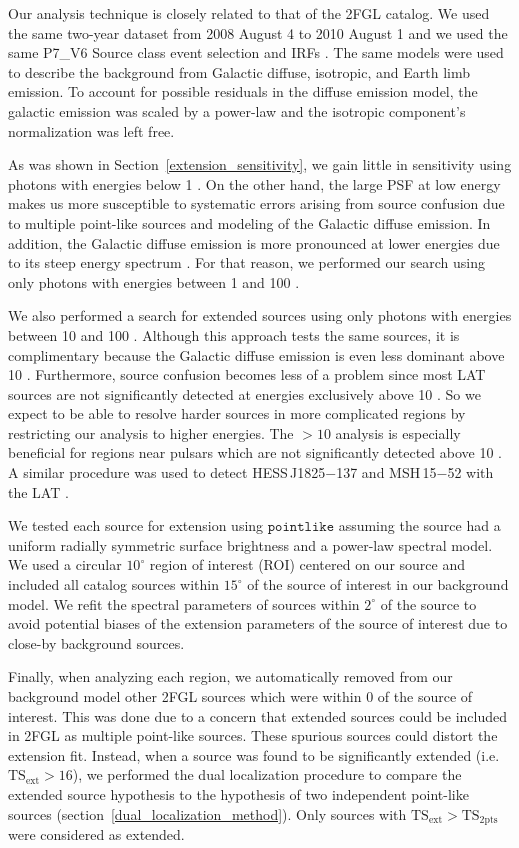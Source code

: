 \documentclass[12pt,preprint]{aastex}
\newcommand{\gev}{\text{GeV}\xspace}
\newcommand{\tsext}{{\ensuremath{\text{TS}_{\text{ext}}}}\xspace}
\newcommand{\tsinc}{\ensuremath{\text{TS}_{\text{2pts}}}\xspace}
\newcommand{\pointlike}{\ensuremath{\mathtt{pointlike}}\xspace}
\newcommand{\degree}{^\circ\xspace}
\begin{document}
Our analysis technique is closely related to that 
of the 2FGL catalog. We used the same two-year dataset from 2008 August 4
to 2010 August 1 and we used the same P7\_V6 Source class
event selection and IRFs \citep{lat_on_orbit_psf}.  
The same 
models were used to describe the background from Galactic diffuse, isotropic, and
Earth limb emission.  To account for possible residuals in the diffuse
emission model, the galactic emission was scaled by a power-law
and the isotropic component's normalization was left free.

As was shown in Section~\ref{extension_sensitivity}, we gain little in
sensitivity using photons with energies below 1 \gev. On the other hand,
the large PSF at low energy makes us more susceptible to systematic
errors arising from source confusion due to multiple point-like sources
and modeling of the Galactic diffuse emission. In addition, the Galactic
diffuse emission is more pronounced at lower energies due to its steep
energy spectrum \citep{intermediate_diffuse_lat}.  For that reason,
we performed our search using only photons with energies between 1 \gev
and 100 \gev.

We also performed a search for extended sources using only photons with energies
between 10 \gev and 100 \gev. 
Although this approach tests the same
sources, it is complimentary because the Galactic diffuse
emission is even less dominant above 10 \gev. Furthermore, source
confusion becomes less of a problem since most LAT sources are not
significantly detected at energies exclusively above 10 \gev. So we
expect to be able to resolve harder sources in more complicated regions
by restricting our analysis to higher energies. The $>10$ \gev
analysis is
especially
beneficial for regions near pulsars which are not significantly detected 
above 10 \gev. A similar procedure was
used to detect HESS\,J1825$-$137 and MSH\,15$-$52 with the LAT
\citep{msh1552,fermi_hess_j1825}.

We tested each source for extension using
\pointlike
assuming the source had a uniform radially symmetric surface brightness
and a power-law spectral model.
We used a circular $10\degree$ region of interest (ROI) centered on our source and
included all catalog sources within $15\degree$ of the source of interest
in our background model.
We refit the spectral parameters of sources within $2\degree$ of the source
to avoid potential biases of the extension parameters of the source of
interest due to close-by background sources.

Finally, when analyzing each region, we automatically removed from
our background model other 2FGL sources which were within 0 of
the source of interest. This was done due
to a concern that extended sources could be included in 2FGL as multiple
point-like sources. These spurious sources could distort the extension
fit.  Instead, when a source was found to be significantly extended
(i.e. $\tsext>16$), we performed the dual localization procedure 
to compare the extended source
hypothesis to the hypothesis of two independent point-like sources
(section~\ref{dual_localization_method}). Only
sources with $\tsext>\tsinc$ were considered as extended.
\end{document}
